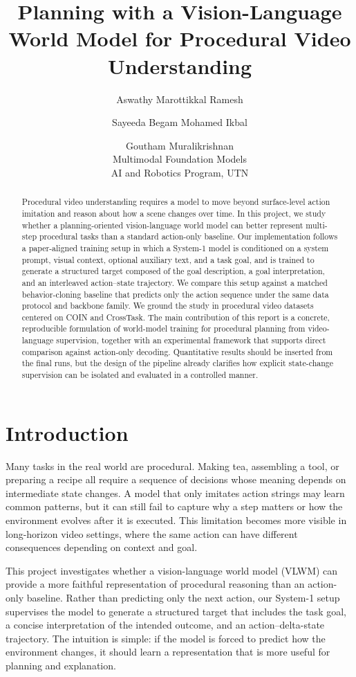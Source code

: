\documentclass[11pt]{article}
\title{\textbf{Planning with a Vision-Language World Model for Procedural Video Understanding}}
\author{
  Aswathy Marottikkal Ramesh \and
  Sayeeda Begam Mohamed Ikbal \and
  Goutham Muralikrishnan \\
  Multimodal Foundation Models \\
  AI and Robotics Program, UTN
}
\date{\fillme{March 2026}}
\begin{document}
\maketitle

\begin{abstract}
Procedural video understanding requires a model to move beyond surface-level action imitation and reason about how a scene changes over time. In this project, we study whether a planning-oriented vision-language world model can better represent multi-step procedural tasks than a standard action-only baseline. Our implementation follows a paper-aligned training setup in which a System-1 model is conditioned on a system prompt, visual context, optional auxiliary text, and a task goal, and is trained to generate a structured target composed of the goal description, a goal interpretation, and an interleaved action--state trajectory. We compare this setup against a matched behavior-cloning baseline that predicts only the action sequence under the same data protocol and backbone family. We ground the study in procedural video datasets centered on COIN and CrossTask. The main contribution of this report is a concrete, reproducible formulation of world-model training for procedural planning from video-language supervision, together with an experimental framework that supports direct comparison against action-only decoding. Quantitative results should be inserted from the final runs, but the design of the pipeline already clarifies how explicit state-change supervision can be isolated and evaluated in a controlled manner.
\end{abstract}

\section{Introduction}
Many tasks in the real world are procedural. Making tea, assembling a tool, or preparing a recipe all require a sequence of decisions whose meaning depends on intermediate state changes. A model that only imitates action strings may learn common patterns, but it can still fail to capture why a step matters or how the environment evolves after it is executed. This limitation becomes more visible in long-horizon video settings, where the same action can have different consequences depending on context and goal.

This project investigates whether a vision-language world model (VLWM) can provide a more faithful representation of procedural reasoning than an action-only baseline. Rather than predicting only the next action, our System-1 setup supervises the model to generate a structured target that includes the task goal, a concise interpretation of the intended outcome, and an action--delta-state trajectory. The intuition is simple: if the model is forced to predict how the environment changes, it should learn a representation that is more useful for planning and explanation.
\end{document}
